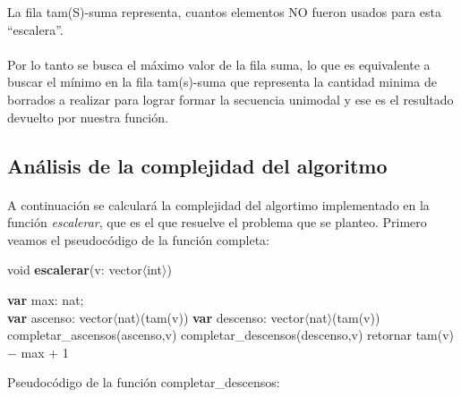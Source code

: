 La fila tam(S)-suma representa, cuantos elementos NO fueron usados para esta ``escalera''. 


\paragraph{}
Por lo tanto se busca el máximo valor de la fila suma, lo que es equivalente a buscar el mínimo en la fila tam(s)-suma que representa la cantidad minima de borrados a realizar para lograr formar la secuencia unimodal y ese es el resultado devuelto por nuestra función.


\subsection{Análisis de la complejidad del algoritmo}

\paragraph{}
A continuación se calculará la complejidad del algortimo implementado en la función \textit{escalerar}, que es el que resuelve el problema que se planteo. Primero veamos el pseudocódigo de la función completa:

\vspace*{30pt}
void \textbf{escalerar}(v: vector$\langle$int$\rangle$)\\
	\begin{algorithm}[H]
\BlankLine		
      \textbf{var} max: nat;\\
      \textbf{var} ascenso: vector$\langle$nat$\rangle$(tam(v))
      \textbf{var} descenso: vector$\langle$nat$\rangle$(tam(v))
\BlankLine		
      completar\_ascensos(ascenso,v)
      completar\_descensos(descenso,v)	
\BlankLine		
\BlankLine		
	retornar  tam(v) $-$ max $+$ 1	



\end{algorithm}


\vspace*{1cm}
Pseudocódigo de la función completar\_descensos:
\\
\\

